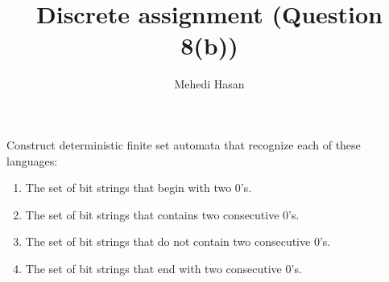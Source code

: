\documentclass[12pt,class=article,crop=false]{standalone}
\begin{document}
\title{Discrete assignment (Question 8(b))}
\author{Mehedi Hasan}
\maketitle
\begin{prob}
    Construct deterministic finite set automata that recognize each of these languages:
    \begin{enumerate}[label=(\alph*)]
        \item The set of bit strings that begin with two $ 0 $'s.
        \item The set of bit strings that contains two consecutive $ 0 $'s.
        \item The set of bit strings that do not contain two consecutive $ 0 $'s.
        \item The set of bit strings that end with two consecutive $ 0 $'s.
    \end{enumerate}
\end{prob}
\end{document}
